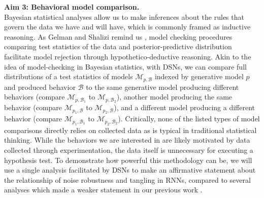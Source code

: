 \documentclass[11pt]{article}
\begin{document}
\textbf{Aim 3: Behavioral model comparison.} \\
Bayesian statistical analyses allow us to make inferences about the rules that govern the data we have and will have, which is commonly framed as inductive reasoning.  As Gelman and Shalizi remind us \cite{gelman2013philosophy}, model checking procedures comparing test statistics of the data and posterior-predictive distribution facilitate model rejection through hypothetico-deductive reasoning.  Akin to the idea of model-checking in Bayesian statistics, with DSNs, we can compare full distributions of a test statistics of models $\mathcal{M}_{p,\mathcal{B}}$ indexed by generative model $p$ and produced behavior $\mathcal{B}$ to the same generative model producing different behaviors (compare $\mathcal{M}_{p,\mathcal{B}_1}$ to $\mathcal{M}_{p,\mathcal{B}_2}$), another model producing the same behavior (compare $\mathcal{M}_{p_1,\mathcal{B}}$ to $\mathcal{M}_{p_2,\mathcal{B}}$), and a different model producing a different behavior (compare $\mathcal{M}_{p_1,\mathcal{B}_1}$ to $\mathcal{M}_{p_2,\mathcal{B}_2}$).  Critically, none of the listed types of model comparisons directly relies on collected data as is typical in traditional statistical thinking.  While the behaviors we are interested in are likely motivated by data collected through experimentation, the data itself is unnecessary for executing a hypothesis test.  To demonstrate how powerful this methodology can be, we will use a single analysis facilitated by DSNs to make an affirmative statement about the relationship of noise robustness and tangling in RNNs, compared to several analyses which made a weaker statement in our previous work \cite{russo2018motor}.
\end{document}

